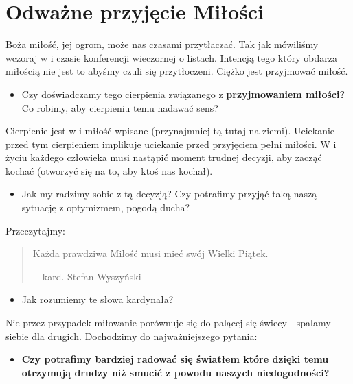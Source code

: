 \documentclass[a5paper,10pt,polish]{book}
\begin{document}
\section{Odważne przyjęcie Miłości}
\label{babice2006-wiosna-knurow/spotkanie2:odwazne-przyjecie-milosci}
Boża miłość, jej ogrom, może nas czasami przytłaczać. Tak jak mówiliśmy wczoraj w i czasie konferencji wieczornej o listach. Intencją tego który obdarza miłością nie jest to abyśmy czuli się przytłoczeni. Ciężko jest przyjmować miłość.
\begin{itemize}
\item {} 
Czy doświadczamy tego cierpienia związanego z \textbf{przyjmowaniem miłości?} Co robimy, aby cierpieniu temu nadawać sens?

\end{itemize}

Cierpienie  jest  w i miłość  wpisane (przynajmniej  tą  tutaj na ziemi). Uciekanie przed tym cierpieniem implikuje uciekanie przed przyjęciem pełni miłości. W i życiu każdego człowieka musi nastąpić moment trudnej decyzji, aby zacząć kochać (otworzyć się na to, aby ktoś nas kochał).
\begin{itemize}
\item {} 
Jak my radzimy sobie z tą decyzją? Czy potrafimy przyjąć taką naszą sytuację z optymizmem, pogodą ducha?

\end{itemize}

Przeczytajmy:
\begin{quote}

Każda prawdziwa Miłość musi mieć swój Wielki Piątek.

\begin{flushright}
---kard. Stefan Wyszyński
\end{flushright}
\end{quote}
\begin{itemize}
\item {} 
Jak rozumiemy te słowa kardynała?

\end{itemize}

Nie przez przypadek miłowanie porównuje się do palącej  się świecy - spalamy siebie dla drugich. Dochodzimy do najważniejszego pytania:
\begin{itemize}
\item {} 
\textbf{Czy potrafimy  bardziej radować się światłem które dzięki temu otrzymują drudzy niż smucić z powodu naszych niedogodności?}

\end{itemize}
\end{document}
